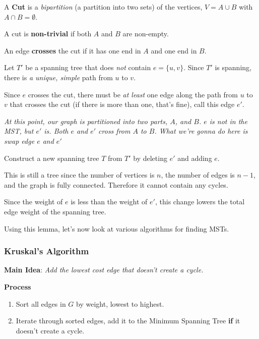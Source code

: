 \documentclass[12pt]{article}
\begin{document}
   {
    A {\bf Cut} is a {\it bipartition} (a partition into two sets) of the
    vertices, $V = A \cup B$ with $A \cap B = \emptyset$.

    A cut is {\bf non-trivial} if both $A$ and $B$ are non-empty.

    An edge {\bf crosses} the cut if it has one end in $A$ and one end in $B$.
  }

  {
    Let $T'$ be a spanning tree that does {\it not} contain $e = \{u, v\}$. Since
    $T'$ is spanning, there is {\it a unique, simple} path from $u$ to $v$.

    Since $e$ crosses the cut, there must be {\it at least} one edge along the path
    from $u$ to $v$ that crosses the cut (if there is more than one, that's fine),
    call this edge $e'$.

    {
      \it At this point, our graph is partitioned into two parts, $A$, and $B$.
      $e$ is not in the MST, but $e'$ is. Both $e$ and $e'$ cross from $A$ to
      $B$. What we're gonna do here is swap edge $e$ and $e'$
    }

    Construct a new spanning tree $T$ from $T'$ by deleting $e'$ and adding $e$.

    This is still a tree since the number of vertices is $n$, the number of edges is
    $n - 1$, and the graph is fully connected. Therefore it cannot contain any
    cycles.

    Since the weight of $e$ is less than the weight of $e'$, this change lowers the
    total edge weight of the spanning tree.
  }

  Using this lemma, let's now look at various algorithms for finding MSTs.

  \subsubsection{Kruskal's Algorithm}

  {\bf Main Idea}: {\it Add the lowest cost edge that doesn't create a cycle.}

  {\bf Process}

  \begin{enumerate}
    \item Sort all edges in $G$ by weight, lowest to highest.
    \item Iterate through sorted edges, add it to the Minimum Spanning Tree {\bf
      if} it doesn't create a cycle.
  \end{enumerate}
\end{document}
